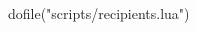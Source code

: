 \newpage
\begin{luacode*}
  dofile("scripts/recipients.lua")
\end{luacode*}

\begin{spacing}{1}
\end{spacing}
